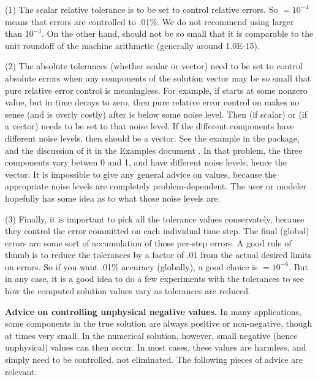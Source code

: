 (1) The scalar relative tolerance  is to be set to control relative
errors.  So  $= 10^{-4}$ means that errors are controlled to .01\%.  
We do not recommend using  larger than $10^{-3}$.  On the other hand,
 should not be so small that it is comparable to the unit roundoff
of the machine arithmetic (generally around 1.0E-15).

(2) The absolute tolerances  (whether scalar or vector) need to
be set to control absolute errors when any components of the solution
vector  may be so small that pure relative error control is
meaningless.  For example, if  starts at some nonzero value, but in time
decays to zero, then pure relative error control on  makes no sense
(and is overly costly) after  is below some noise level.  Then
 (if scalar) or  (if a vector) needs to be set to that
noise level.  If the different components have different noise levels,
then  should be a vector.  See the example  in the
{\cvode} package, and the discussion of it in the {\cvode} Examples document
\cite{cvode_ex}.
In that problem, the three components vary betwen 0 and 1, and have
different noise levels; hence the  vector.  It is impossible to
give any general advice on  values, because the appropriate noise
levels are completely problem-dependent.  The user or modeler hopefully has
some idea as to what those noise levels are.

(3) Finally, it is important to pick all the tolerance values conservately,
because they control the error committed on each individual time step.
The final (global) errors are some sort of accumulation of those
per-step errors.  A good rule of thumb is to reduce the tolerances by a
factor of .01 from the actual desired limits on errors.  So if you
want .01\% accuracy (globally), a good choice is  $= 10^{-6}$.
But in any case, it is a good idea to do a few experiments with
the tolerances to see how the computed solution values vary as
tolerances are reduced.

\vspace{0.1in}
{\bf Advice on controlling unphysical negative values.}
In many applications, some components in the true solution are always
positive or non-negative, though at times very small.  In the numerical
solution, however, small negative (hence unphysical) values can then
occur.  In most cases, these values are harmless, and simply need to
be controlled, not eliminated. The following pieces of advice are relevant.

